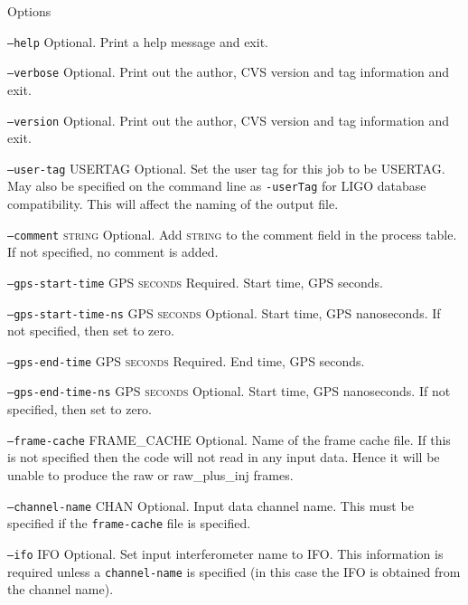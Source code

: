 \begin{entry}
\item[Options]\leavevmode
\begin{entry}

\item[\texttt{--help}]  Optional.  Print a help message and exit.

\item[\texttt{--verbose}] Optional.  Print out the author, CVS version
and tag information and exit.

\item[\texttt{--version}] Optional.  Print out the author, CVS version and
tag information and exit.
  
\item[\texttt{--user-tag} \textsc{USERTAG}] Optional. Set the user tag
for this job to be \textsc{USERTAG}. May also be specified on the command
line as \texttt{-userTag} for LIGO database compatibility.  This will
affect the naming of the output file.

\item[\texttt{--comment} \textsc{string}] Optional. Add \textsc{string}
to the comment field in the process table. If not specified, no comment
is added. 

\item[\texttt{--gps-start-time} \textsc{GPS seconds}] Required.  Start
time, GPS seconds.

\item[\texttt{--gps-start-time-ns} \textsc{GPS seconds}] Optional.
Start time, GPS nanoseconds.  If not specified, then set to zero.

\item[\texttt{--gps-end-time} \textsc{GPS seconds}] Required.  End
time, GPS seconds.

\item[\texttt{--gps-end-time-ns} \textsc{GPS seconds}] Optional.
Start time, GPS nanoseconds.  If not specified, then set to zero.

\item[\texttt{--frame-cache} \textsc{FRAME\_CACHE}] Optional.  Name of
the frame cache file.  If this is not specified then the code will not
read in any input data.  Hence it will be unable to produce the raw or
raw\_plus\_inj frames.

\item[\texttt{--channel-name} \textsc{CHAN}] Optional.  Input data
channel name.  This must be specified if the \texttt{frame-cache} file
is specified. 
 
\item[\texttt{--ifo} \textsc{IFO}] Optional.  Set input interferometer
name to \textsc{IFO}.  This information is required unless a
\texttt{channel-name} is specified (in this case the \textsc{IFO} is
obtained from the channel name).


\end{entry}
\end{entry}
